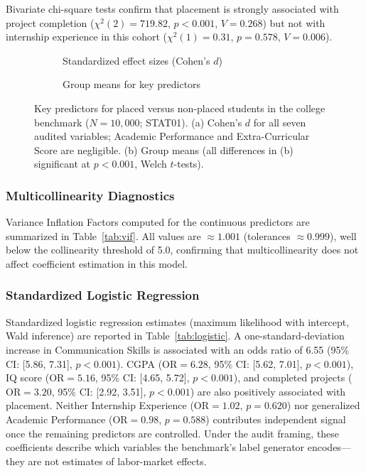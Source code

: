 \documentclass[journal]{IEEEtran}
\begin{document}
Bivariate chi-square tests confirm that placement is strongly associated with project completion ($\chi^2(2) = 719.82$, $p < 0.001$, $V = 0.268$) but not with internship experience in this cohort ($\chi^2(1) = 0.31$, $p = 0.578$, $V = 0.006$).

\begin{figure}[!htbp]
    \centering
    \begin{subfigure}[t]{0.48\textwidth}
        \centering
        \FigEffectSizes
        \caption{Standardized effect sizes (Cohen's $d$)}
        \label{fig:placement_a}
    \end{subfigure}
    \hfill
    \begin{subfigure}[t]{0.48\textwidth}
        \centering
        \FigMeans
        \caption{Group means for key predictors}
        \label{fig:placement_b}
    \end{subfigure}
    \caption{Key predictors for placed versus non-placed students in the college benchmark ($N = 10{,}000$; STAT01). (a) Cohen's $d$ for all seven audited variables; Academic Performance and Extra-Curricular Score are negligible. (b) Group means (all differences in (b) significant at $p < 0.001$, Welch $t$-tests).}
    \label{fig:placement}
\end{figure}

\subsubsection{Multicollinearity Diagnostics}
Variance Inflation Factors computed for the continuous predictors are summarized in Table~\ref{tab:vif}. All values are $\approx 1.001$ (tolerances $\approx 0.999$), well below the collinearity threshold of 5.0, confirming that multicollinearity does not affect coefficient estimation in this model.

\begin{table}[!htbp]
\centering
\caption{Variance Inflation Factor (VIF) Multicollinearity Audit}
\label{tab:vif}
\resizebox{\columnwidth}{!}{%

}
\end{table}

\subsubsection{Standardized Logistic Regression}
Standardized logistic regression estimates (maximum likelihood with intercept, Wald inference) are reported in Table~\ref{tab:logistic}. A one-standard-deviation increase in Communication Skills is associated with an odds ratio of 6.55 (95\% CI: [5.86, 7.31], $p < 0.001$). CGPA ($\text{OR} = 6.28$, 95\% CI: [5.62, 7.01], $p < 0.001$), IQ score ($\text{OR} = 5.16$, 95\% CI: [4.65, 5.72], $p < 0.001$), and completed projects ($\text{OR} = 3.20$, 95\% CI: [2.92, 3.51], $p < 0.001$) are also positively associated with placement. Neither Internship Experience ($\text{OR} = 1.02$, $p = 0.620$) nor generalized Academic Performance ($\text{OR} = 0.98$, $p = 0.588$) contributes independent signal once the remaining predictors are controlled. Under the audit framing, these coefficients describe which variables the benchmark's label generator encodes---they are not estimates of labor-market effects.
\end{document}
